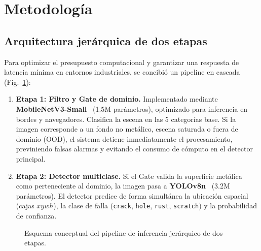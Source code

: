 \documentclass[11pt,a4paper]{article}
\begin{document}
\section{Metodología}

\subsection{Arquitectura jerárquica de dos etapas}
Para optimizar el presupuesto computacional y garantizar una respuesta de latencia
mínima en entornos industriales, se concibió un pipeline en cascada
(Fig.~\ref{fig:pipeline_desc}):

\begin{enumerate}[leftmargin=1.6em,itemsep=0.2em]
  \item \textbf{Etapa 1: Filtro y Gate de dominio.} Implementado mediante
  \textbf{MobileNetV3-Small}~\cite{mobilenetv3} (1.5M parámetros), optimizado para
  inferencia en bordes y navegadores. Clasifica la escena en las 5 categorías base.
  Si la imagen corresponde a un fondo no metálico, escena saturada o fuera de
  dominio (OOD), el sistema detiene inmediatamente el procesamiento, previniendo
  falsas alarmas y evitando el consumo de cómputo en el detector principal.
  \item \textbf{Etapa 2: Detector multiclase.} Si el Gate valida la superficie
  metálica como perteneciente al dominio, la imagen pasa a \textbf{YOLOv8n}~\cite{yolov8}
  (3.2M parámetros). El detector predice de forma simultánea la ubicación espacial
  (cajas $xywh$), la clase de falla (\texttt{crack}, \texttt{hole}, \texttt{rust},
  \texttt{scratch}) y la probabilidad de confianza.
\end{enumerate}

\begin{figure}[H]
  \centering
  \caption{Esquema conceptual del pipeline de inferencia jerárquico de dos etapas.}
  \label{fig:pipeline_desc}
\end{figure}
\end{document}
